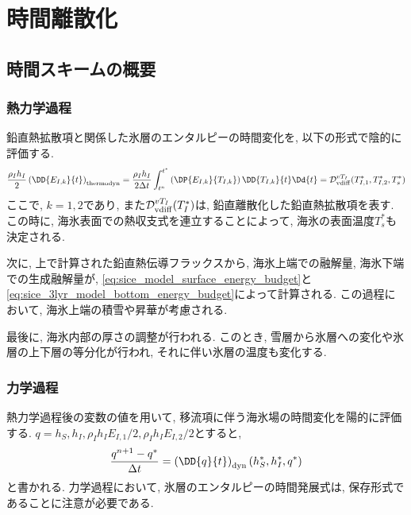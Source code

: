 \section{時間離散化}\label{sice_model_time_scheme}
\subsection{時間スキームの概要}\label{sice_model_time_scheme_brief}
\subsubsection*{熱力学過程}\label{sice_model_time_scheme_brief_thermodyn}
鉛直熱拡散項と関係した氷層のエンタルピーの時間変化を, 以下の形式で陰的に評価する. 
\begin{equation*}
 \dfrac{\rho_I h_I}{2} \left(\DD{E_{I,k}}{t}\right)_{\rm thermodyn} 
  = \dfrac{\rho_I h_I}{2 \Delta t} 
  \int_{t^n}^{t^*} \left(\DP{E_{I,k}}{T_{I,k}}\right)  \DD{T_{I,k}}{t} \Dd{t}
  = \mathcal{D}_{\rm vdiff}^{vT_{I}} (T_{I,1}^*, T_{I,2}^*, T_s^*)
\end{equation*}
ここで, $k=1,2$であり, 
また$\mathcal{D}_{\rm vdiff}^{vT_{I}} (T_I^*)$は, 鉛直離散化した鉛直熱拡散項を表す. 
この時に, 海氷表面での熱収支式を連立することによって, 海氷の表面温度$T_s^*$も決定される.

次に, 上で計算された鉛直熱伝導フラックスから, 海氷上端での融解量, 海氷下端での生成融解量が, 
\eqref{eq:sice_model_surface_energy_budget}と\eqref{eq:sice_3lyr_model_bottom_energy_budget}によって計算される.
この過程において, 海氷上端の積雪や昇華が考慮される. 

最後に, 海氷内部の厚さの調整が行われる. 
このとき, 雪層から氷層への変化や氷層の上下層の等分化が行われ, それに伴い氷層の温度も変化する.  

\subsubsection*{力学過程}\label{sice_model_time_scheme_brief_dynamics}
熱力学過程後の変数の値を用いて, 移流項に伴う海氷場の時間変化を陽的に評価する. 
$q=h_S, h_I, \rho_I h_I E_{I,1}/2, \rho_I h_I E_{I,2}/2$とすると, 
\begin{equation*}
 \dfrac{q^{n+1} - q^*}{\Delta t}
 = \left(\DD{q}{t}\right)_{\rm dyn} (h_S^*, h_I^*, q^*)
\end{equation*}
と書かれる. 
力学過程において, 氷層のエンタルピーの時間発展式は, 保存形式であることに注意が必要である. 

